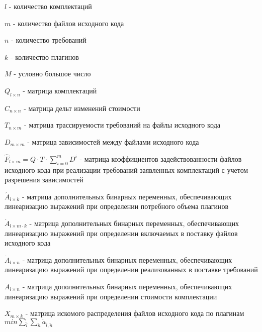 $l$ - количество комплектаций

$m$ - количество файлов исходного кода

$n$ - количество требований

$k$ - количество плагинов

$M$ - условно большое число

$Q_{l \times n}$ - матрица комплектаций

$C_{n \times n}$ - матрица дельт изменений стоимости

$T_{n \times m}$ - матрица трассируемости требований на файлы исходного кода

$D_{m \times m}$ - матрица зависимостей между файлами исходного кода

$\displaystyle \hat{F}_{l \times m} = Q \cdot T \cdot \sum^{m}_{i = 0} D^{i}$ - матрица коэффициентов задействованности файлов исходного кода при реализации требований заявленных комплектаций с учетом разрешения зависимостей

$\acute{A}_{l \times k}$ - матрица дополнительных бинарных переменных, обеспечивающих линеаризацию выражений при определении потребного объема плагинов

$\grave{A}_{l \times m \cdot k}$ - матрица дополнительных бинарных переменных, обеспечивающих линеаризацию выражений при определении включаемых в поставку файлов исходного кода

$\dot{A}_{l \times n}$ - матрица дополнительных бинарных переменных, обеспечивающих линеаризацию выражений при определении реализованных в поставке требований

$\ddot{A}_{l \times n}$ - матрица дополнительных бинарных переменных, обеспечивающих линеаризацию выражений при определении стоимости комплектации

$X_{m \times k}$ - матрица искомого распределения файлов исходного кода по плагинам \\[2\baselineskip]

$\displaystyle min \sum_{\tilde{l}}\sum_{\tilde{n}} \ddot{a}_{\tilde{l}, {\tilde{n}}}$\\[1\baselineskip]

